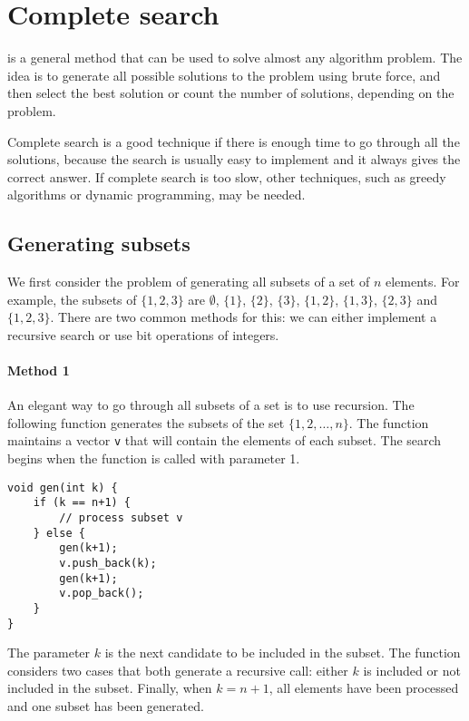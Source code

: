 \chapter{Complete search}

is a general method that can be used
to solve almost any algorithm problem.
The idea is to generate all possible
solutions to the problem using brute force,
and then select the best solution or count the
number of solutions, depending on the problem.

Complete search is a good technique
if there is enough time to go through all the solutions,
because the search is usually easy to implement
and it always gives the correct answer.
If complete search is too slow,
other techniques, such as greedy algorithms or
dynamic programming, may be needed.

\section{Generating subsets}


We first consider the problem of generating
all subsets of a set of $n$ elements.
For example, the subsets of $\{1,2,3\}$ are
$\emptyset$, $\{1\}$, $\{2\}$, $\{3\}$, $\{1,2\}$,
$\{1,3\}$, $\{2,3\}$ and $\{1,2,3\}$.
There are two common methods for this:
we can either implement a recursive search
or use bit operations of integers.

\subsubsection{Method 1}

An elegant way to go through all subsets
of a set is to use recursion.
The following function
generates the subsets of the set
$\{1,2,\ldots,n\}$.
The function maintains a vector \texttt{v}
that will contain the elements of each subset.
The search begins when the function is called
with parameter 1.

\begin{lstlisting}
void gen(int k) {
    if (k == n+1) {
        // process subset v
    } else {
        gen(k+1);
        v.push_back(k);
        gen(k+1);
        v.pop_back();
    }
}
\end{lstlisting}

The parameter $k$ is the next
candidate to be included in the subset.
The function considers two cases that both
generate a recursive call:
either $k$ is included or not included in the subset.
Finally, when $k=n+1$, all elements have been processed
and one subset has been generated.

